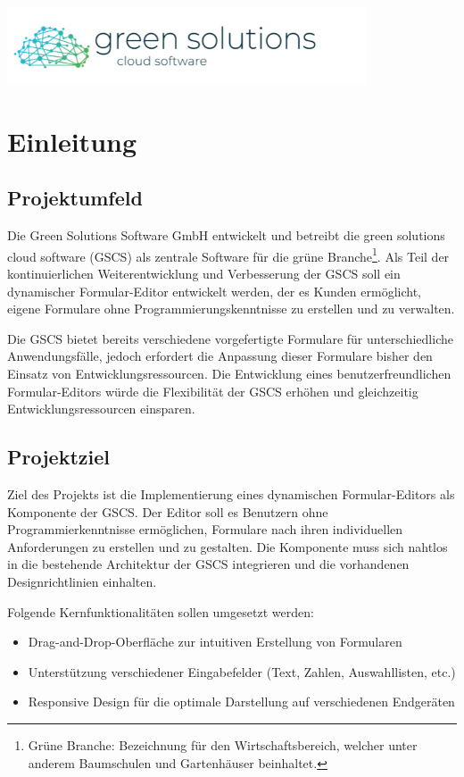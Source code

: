 \documentclass[a4paper,11pt]{article}
\begin{document}
\begin{titlepage}
\begin{center}
\includegraphics[width=0.8\textwidth]{green_solutions_logo}
\end{center}
\end{titlepage}


\tableofcontents
\newpage

\section{Einleitung}
\subsection{Projektumfeld}
Die Green Solutions Software GmbH entwickelt und betreibt die green solutions cloud software (GSCS) als zentrale Software für die grüne Branche\footnote{Grüne Branche: Bezeichnung für den Wirtschaftsbereich, welcher unter anderem Baumschulen und Gartenhäuser beinhaltet.}. Als Teil der kontinuierlichen Weiterentwicklung und Verbesserung der GSCS soll ein dynamischer Formular-Editor entwickelt werden, der es Kunden ermöglicht, eigene Formulare ohne Programmierungskenntnisse zu erstellen und zu verwalten.

\noindent Die GSCS bietet bereits verschiedene vorgefertigte Formulare für unterschiedliche Anwendungsfälle, jedoch erfordert die Anpassung dieser Formulare bisher den Einsatz von Entwicklungsressourcen. Die Entwicklung eines benutzerfreundlichen Formular-Editors würde die Flexibilität der GSCS erhöhen und gleichzeitig Entwicklungsressourcen einsparen.

\subsection{Projektziel}
Ziel des Projekts ist die Implementierung eines dynamischen Formular-Editors als Komponente der GSCS. Der Editor soll es Benutzern ohne Programmierkenntnisse ermöglichen, Formulare nach ihren individuellen Anforderungen zu erstellen und zu gestalten. Die Komponente muss sich nahtlos in die bestehende Architektur der GSCS integrieren und die vorhandenen Designrichtlinien einhalten.

Folgende Kernfunktionalitäten sollen umgesetzt werden:
\begin{itemize}
  \item Drag-and-Drop-Oberfläche zur intuitiven Erstellung von Formularen
  \item Unterstützung verschiedener Eingabefelder (Text, Zahlen, Auswahllisten, etc.)
  \item Responsive Design für die optimale Darstellung auf verschiedenen Endgeräten
\end{itemize}
\end{document}
